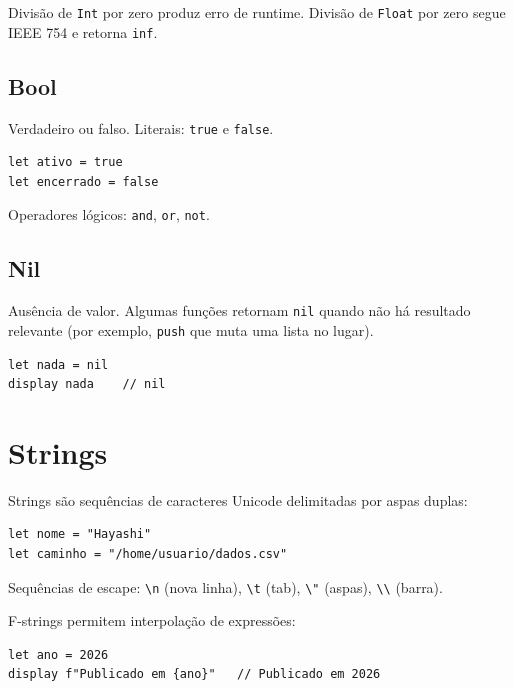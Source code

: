 \begin{nota}
  Divisão de \texttt{Int} por zero produz erro de runtime. Divisão de \texttt{Float}
  por zero segue IEEE 754 e retorna \texttt{inf}.
\end{nota}

\subsection{Bool}

Verdadeiro ou falso. Literais: \lstinline{true} e \lstinline{false}.

\begin{lstlisting}
let ativo = true
let encerrado = false
\end{lstlisting}

Operadores lógicos: \lstinline{and}, \lstinline{or}, \lstinline{not}.

\subsection{Nil}

Ausência de valor. Algumas funções retornam \lstinline{nil} quando não há resultado
relevante (por exemplo, \lstinline{push} que muta uma lista no lugar).

\begin{lstlisting}
let nada = nil
display nada    // nil
\end{lstlisting}

\section{Strings}

Strings são sequências de caracteres Unicode delimitadas por aspas duplas:

\begin{lstlisting}
let nome = "Hayashi"
let caminho = "/home/usuario/dados.csv"
\end{lstlisting}

Sequências de escape: \texttt{\textbackslash n} (nova linha), \texttt{\textbackslash t}
(tab), \texttt{\textbackslash"} (aspas), \texttt{\textbackslash\textbackslash} (barra).

F-strings permitem interpolação de expressões:

\begin{lstlisting}
let ano = 2026
display f"Publicado em {ano}"   // Publicado em 2026
\end{lstlisting}

